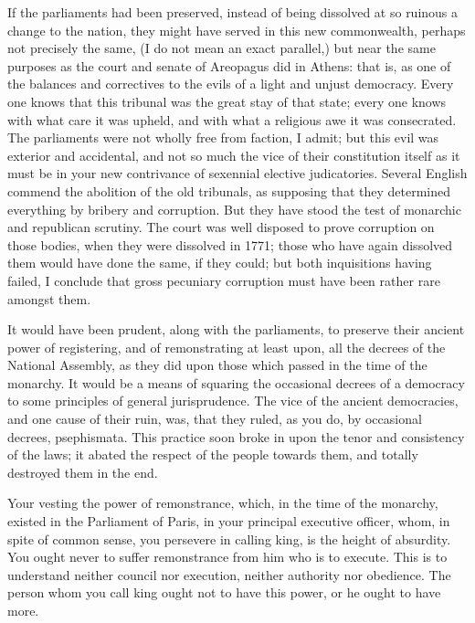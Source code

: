 If the parliaments had been preserved, instead of being dissolved at so ruinous a change to the nation, they might have served in this new commonwealth, perhaps not precisely the same, (I do not mean an exact parallel,) but near the same purposes as the court and senate of Areopagus did in Athens: that is, as one of the balances and correctives to the evils of a light and unjust democracy. Every one knows that this tribunal was the great stay of that state; every one knows with what care it was upheld, and with what a religious awe it was consecrated. The parliaments were not wholly free from faction, I admit; but this evil was exterior and accidental, and not so much the vice of their constitution itself as it must be in your new contrivance of sexennial elective judicatories. Several English commend the abolition of the old tribunals, as supposing that they determined everything by bribery and corruption. But they have stood the test of monarchic and republican scrutiny. The court was well disposed to prove corruption on those bodies, when they were dissolved in 1771; those who have again dissolved them would have done the same, if they could; but both inquisitions having failed, I conclude that gross pecuniary corruption must have been rather rare amongst them.

It would have been prudent, along with the parliaments, to preserve their ancient power of registering, and of remonstrating at least upon, all the decrees of the National Assembly, as they did upon those which passed in the time of the monarchy. It would be a means of squaring the occasional decrees of a democracy to some principles of general jurisprudence. The vice of the ancient democracies, and one cause of their ruin, was, that they ruled, as you do, by occasional decrees, psephismata. This practice soon broke in upon the tenor and consistency of the laws; it abated the respect of the people towards them, and totally destroyed them in the end.

Your vesting the power of remonstrance, which, in the time of the monarchy, existed in the Parliament of Paris, in your principal executive officer, whom, in spite of common sense, you persevere in calling king, is the height of absurdity. You ought never to suffer remonstrance from him who is to execute. This is to understand neither council nor execution, neither authority nor obedience. The person whom you call king ought not to have this power, or he ought to have more.

